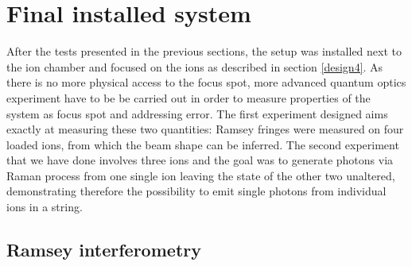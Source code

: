 \newpage
\section{Final installed system}
After the tests presented in the previous sections, the setup was installed next to the ion chamber and focused on the ions as described in section \ref{design4}. As there is no more physical access to the focus spot, more advanced quantum optics experiment have to be be carried out in order to measure properties of the system as focus spot and addressing error. The first experiment designed aims exactly at measuring these two quantities: Ramsey fringes were measured on four loaded ions, from which the beam shape can be inferred.
The second experiment that we have done involves three ions and the goal was to generate photons via Raman process from one single ion leaving the state of the other two unaltered, demonstrating therefore the possibility to emit single photons from individual ions in a string.

\subsection{Ramsey interferometry}

